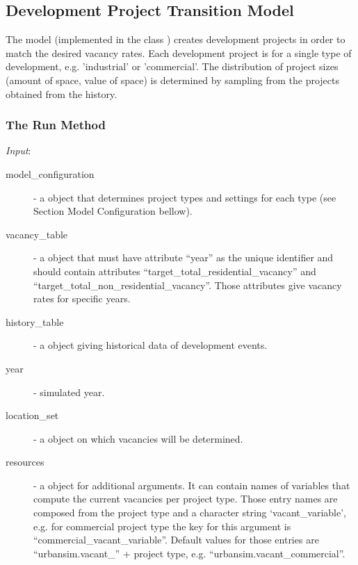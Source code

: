 %
\subsection{Development Project Transition Model}
\modelsindex
%
\label{sec:development-project-transition-model}
%
The model \modelsindex (implemented in the class ) \modelsindex
creates development projects in order to match the desired vacancy rates. Each
development project is for a single type of development, e.g.  'industrial' or
'commercial'.  The distribution of project sizes (amount of space, value of
space) is determined by sampling from the projects obtained from the history.

\subsubsection{The Run Method}
%
{\it Input}:
\begin{description}
\item[model_configuration] - a  object that determines
  project types and settings for each type (see
  Section Model \modelsindex Configuration bellow).
\item[vacancy_table] - a  \datasetindex object that must have attribute \attributesindex
  ``year'' as the unique identifier and should contain attributes \attributesindex
  ``target_total_residential_vacancy'' and
  ``target_total_non_residential_vacancy''. Those attributes \attributesindex give vacancy
  rates for specific years.
\item[history_table] - a  \datasetindex object giving historical data of
  development events.
\item[year] - simulated year.
\item[location_set] - a  \datasetindex object on which vacancies will be
  determined.
\item[resources] - a  object for additional arguments. It can
  contain names of variables \variablesindex that compute the current vacancies per project
  type. Those entry names are composed from the project type and a character
  string `vacant_variable', e.g. for commercial project type the key for this
  argument is ``commercial_vacant_variable''.  Default values for those
  entries are ``urbansim.vacant_'' + project type, e.g.
  ``urbansim.vacant_commercial''.
\end{description}



